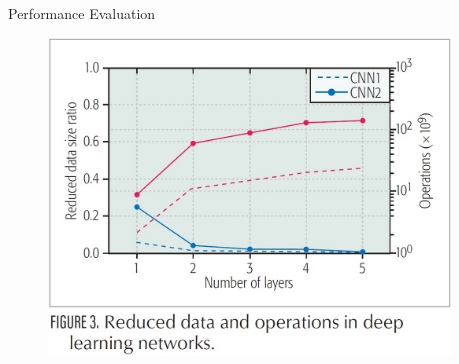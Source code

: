 \documentclass[final]{beamer}
\newlength{\sepwid}
\newlength{\onecolwid}
\newlength{\twocolwid}
\begin{document}
\begin{frame}
\begin{columns}[t]
\begin{column}{\twocolwid}
\begin{columns}[t,totalwidth=\twocolwid]
\begin{column}{\onecolwid}
\begin{exampleblock}{Performance Evaluation}

\begin{figure}
\includegraphics[width=0.9\linewidth]{Resources/Figura-3.jpg}
\end{figure}


\end{exampleblock}


\end{column} %

\end{columns} %

\end{column} %

\begin{column}{\sepwid}\end{column} %


\end{columns}
\end{frame}
\end{document}
